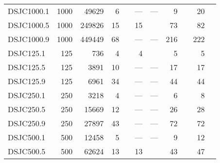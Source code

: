 \begin{longtable}{lrrrlrlrlrl}
  DSJC1000.1 & 1000 & 49629 & 6 & \cite{Held2011} & --- & --- & 9 & \cite{Held2011} & 20 & \cite{Galinier1999,BlochligerI.andZufferey2004,Hertz2008,Malaguti2008,Porumbel2010,Malaguti2011,Zhou2018,Galinier1999,Lu2010,Porumbel2010,Lu2010,Titiloye2011,Moalic2015,Wu2013a,Wu2012a,Wu2013} \\ 
  DSJC1000.5 & 1000 & 249826 & 15 & \cite{Tomita2017} & 15 & \cite{Tomita2017} & 73 & \cite{Held2011} & 82 & \cite{Moalic2015} \\ 
  DSJC1000.9 & 1000 & 449449 & 68 & \cite{us} & --- & --- & 216 & \cite{Held2011} & 222 & \cite{Moalic2015,Titiloye2011,Wu2012a} \\ 
  DSJC125.1 & 125 & 736 & 4 & \cite{Gualandi2012} & 4 & \cite{Gualandi2012} & 5 & \cite{Mendez-Diaz2006,Mendez-Diaz2008,Malaguti2011,Gualandi2012} & 5 & \cite{Zhou2016,Mendez-Diaz2006,Morgenstern1996,FunabikiNobuoandHigashino2000,Malaguti2011,Zhou2018,Wu2013a,Gualandi2012,Brelaz1979,Sewell1996,Segundo2012} \\ 
  DSJC125.5 & 125 & 3891 & 10 & \cite{us} & --- & --- & 17 & \cite{Malaguti2011} & 17 & \cite{Zhou2016,Morgenstern1996,FunabikiNobuoandHigashino2000,Malaguti2008,Malaguti2011,Zhou2018,Wu2013a,Gualandi2012} \\ 
  DSJC125.9 & 125 & 6961 & 34 & \cite{us} & --- & --- & 44 & \cite{Malaguti2011} & 44 & \cite{Zhou2016,Morgenstern1996,FunabikiNobuoandHigashino2000,Malaguti2008,Malaguti2011,Zhou2018,Wu2013a,Gualandi2012} \\ 
  DSJC250.1 & 250 & 3218 & 4 & \cite{Malaguti2011} & --- & --- & 6 & \cite{Malaguti2011} & 8 & \cite{Zhou2016,Morgenstern1996,FunabikiNobuoandHigashino2000,Malaguti2008,Malaguti2011,Zhou2018,Wu2013a} \\ 
  DSJC250.5 & 250 & 15669 & 12 & \cite{Held2011} & --- & --- & 26 & \cite{Held2011,Gualandi2012} & 28 & \cite{Morgenstern1996,Galinier1999,FunabikiNobuoandHigashino2000,Malaguti2008,Malaguti2011,Wu2013a} \\ 
  DSJC250.9 & 250 & 27897 & 43 & \cite{us} & --- & --- & 72 & \cite{Held2011} & 72 & \cite{Gualandi2012,Morgenstern1996,FunabikiNobuoandHigashino2000,Malaguti2008,Malaguti2011,Zhou2018,Wu2013a,Gualandi2012} \\ 
  DSJC500.1 & 500 & 12458 & 5 & \cite{Held2011} & --- & --- & 9 & \cite{Held2011} & 12 & \cite{Morgenstern1996,BlochligerI.andZufferey2004,Hertz2008,FunabikiNobuoandHigashino2000,Malaguti2008,Porumbel2010,Malaguti2011,Wu2013a,Wu2013} \\ 
  DSJC500.5 & 500 & 62624 & 13 & \cite{Held2011,Tomita2017} & 13 & \cite{Tomita2017} & 43 & \cite{Held2011} & 47 & \cite{Moalic2015} \\ 

\end{longtable}

